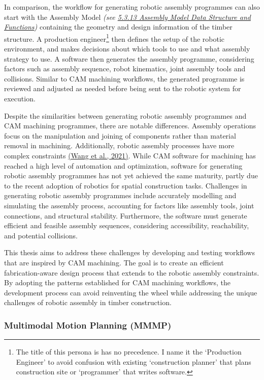 \documentclass[11pt]{book}
\begin{document}
In comparison, the workflow for generating robotic assembly programmes can also start with the Assembly Model \textit{\textcolor[HTML]{B7B7B7}{(see \uline{5.3.13 Assembly Model Data Structure and Functions})}} containing the geometry and design information of the timber structure. A production engineer\footnote{ The title of this persona is has no precedence. I name it the ‘Production Engineer’ to avoid confusion with existing ‘construction planner’ that plans construction site or ‘programmer’ that writes software.} then defines the setup of the robotic environment, and makes decisions about which tools to use and what assembly strategy to use. A software then generates the assembly programme, considering factors such as assembly sequence, robot kinematics, joint assembly tools and collisions. Similar to CAM machining workflows, the generated programme is reviewed and adjusted as needed before being sent to the robotic system for execution.

Despite the similarities between generating robotic assembly programmes and CAM machining programmes, there are notable differences. Assembly operations focus on the manipulation and joining of components rather than material removal in machining. Additionally, robotic assembly processes have more complex constraints \href{https://www.zotero.org/google-docs/?DQYwa5}{(Wang et al., 2021)}. While CAM software for machining has reached a high level of automation and optimization, software for generating robotic assembly programmes has not yet achieved the same maturity, partly due to the recent adoption of robotics for spatial construction tasks. Challenges in generating robotic assembly programmes include accurately modelling and simulating the assembly process, accounting for factors like assembly tools, joint connections, and structural stability. Furthermore, the software must generate efficient and feasible assembly sequences, considering accessibility, reachability, and potential collisions.

This thesis aims to address these challenges by developing and testing workflows that are inspired by CAM machining. The goal is to create an efficient fabrication-aware design process that extends to the robotic assembly constraints. By adopting the patterns established for CAM machining workflows, the development process can avoid reinventing the wheel while addressing the unique challenges of robotic assembly in timber construction.

\vspace{2\baselineskip}
\subsubsection{Multimodal Motion Planning (MMMP)}
\end{document}
